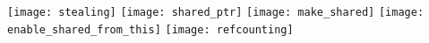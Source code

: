 \documentclass[a4paper,oneside,12pt,]{article}
\begin{document}
\setcounter{page}{1}
\texttt{[image: stealing]}
\clearpage%
\texttt{[image: shared\_ptr]}
\clearpage%
\texttt{[image: make\_shared]}
\clearpage%
\texttt{[image: enable\_shared\_from\_this]}
\clearpage%
\texttt{[image: refcounting]}
\clearpage%
\end{document}
